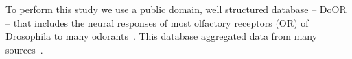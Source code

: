 \documentclass[11pt]{paper} %
\begin{document}
To perform this study we use a public domain, 
well structured database -- DoOR -- 
that includes the neural responses of most olfactory receptors (OR) of Drosophila to many odorants~\cite{Galizia2010}. 
This database aggregated data from many sources~\cite{Bruyne1999,Bruyne2001,Dobritsa2003,Goldman2005,Hallem2004,Hallem2006,
Kreher2005,Kreher2008,Kwon2007,Pelz2006,Pelz2006,Schmuker2007,Stensmyr2003,
Turner2009,VanderGoesvanNaters2007,Yao2005}.














 
\end{document}
